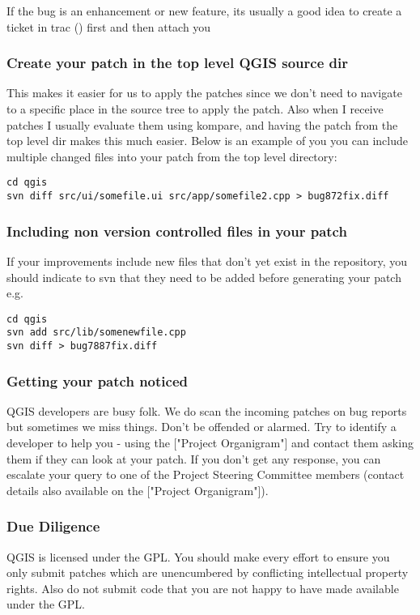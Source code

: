 If the bug is an enhancement or new feature, its usually a good idea to create
a ticket in trac () first and then attach you 

\hypertarget{toc41}{}
\subsubsection{Create your patch in the top level QGIS source dir}
This makes it easier for us to apply the patches since we don't need to
navigate to a specific place in the source tree to apply the patch. Also when I
receive patches I usually evaluate them using kompare, and having the patch
from the top level dir makes this much easier. Below is an example of you you
can include multiple changed files into your patch from the top level
directory:

\begin{verbatim}
cd qgis
svn diff src/ui/somefile.ui src/app/somefile2.cpp > bug872fix.diff
\end{verbatim}

\hypertarget{toc42}{}
\subsubsection{Including non version controlled files in your patch}
If your improvements include new files that don't yet exist in the repository,
you should indicate to svn that they need to be added before generating your
patch e.g.

\begin{verbatim}
cd qgis
svn add src/lib/somenewfile.cpp
svn diff > bug7887fix.diff
\end{verbatim}

\hypertarget{toc43}{}
\subsubsection{Getting your patch noticed}
QGIS developers are busy folk. We do scan the incoming patches on bug reports
but sometimes we miss things.  Don't be offended or alarmed. Try to identify a
developer to help you - using the ["Project Organigram"] and contact them
asking them if they can look at your patch. If you don't get any response, you
can escalate your query to one of the Project Steering Committee members
(contact details also available on the ["Project Organigram"]).

\hypertarget{toc44}{}
\subsubsection{Due Diligence}
QGIS is licensed under the GPL. You should make every effort to ensure you only
submit patches which are unencumbered by conflicting intellectual property
rights. Also do not submit code that you are not happy to have made available
under the GPL.

